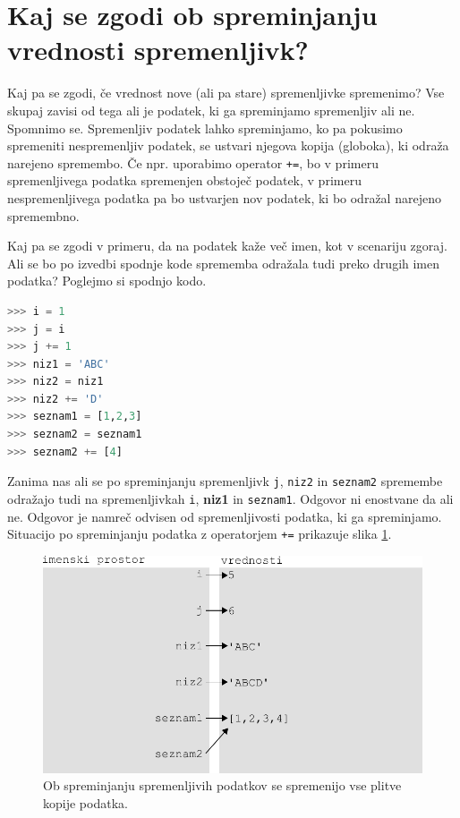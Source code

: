 \section{Kaj se zgodi ob spreminjanju vrednosti spremenljivk?}
Kaj pa se zgodi, če vrednost nove (ali pa stare) spremenljivke spremenimo? Vse skupaj zavisi od tega ali je podatek, ki ga spreminjamo spremenljiv ali ne. Spomnimo se. Spremenljiv podatek lahko spreminjamo, ko pa pokusimo spremeniti nespremenljiv podatek, se ustvari njegova kopija (globoka), ki odraža narejeno spremembo. Če npr. uporabimo operator \texttt{+=}, bo v primeru spremenljivega podatka spremenjen obstoječ podatek, v primeru nespremenljivega podatka pa bo ustvarjen nov podatek, ki bo odražal narejeno spremembno. 

Kaj pa se zgodi v primeru, da na podatek kaže več imen, kot v scenariju zgoraj. Ali se bo po izvedbi spodnje kode sprememba odražala tudi preko drugih imen podatka? Poglejmo si spodnjo kodo.
\begin{lstlisting}[language=Python]
>>> i = 1
>>> j = i
>>> j += 1
>>> niz1 = 'ABC'
>>> niz2 = niz1
>>> niz2 += 'D'
>>> seznam1 = [1,2,3]
>>> seznam2 = seznam1
>>> seznam2 += [4]
\end{lstlisting}
Zanima nas ali se po spreminjanju spremenljivk \texttt{j}, \texttt{niz2} in \texttt{seznam2} spremembe odražajo tudi na spremenljivkah \texttt{i}, \textbf{niz1} in \texttt{seznam1}. Odgovor ni enostvane da ali ne. Odgovor je namreč odvisen od spremenljivosti podatka, ki ga spreminjamo. Situacijo po spreminjanju podatka z operatorjem \texttt{+=} prikazuje slika \ref{img:spremenljivost_3}.
\begin{figure}
    \centering
    \includegraphics[width=\linewidth]{img/spremenljivost_3.pdf}
    \caption{Ob spreminjanju spremenljivih podatkov se spremenijo vse plitve kopije podatka.}
    \label{img:spremenljivost_3}
\end{figure}
